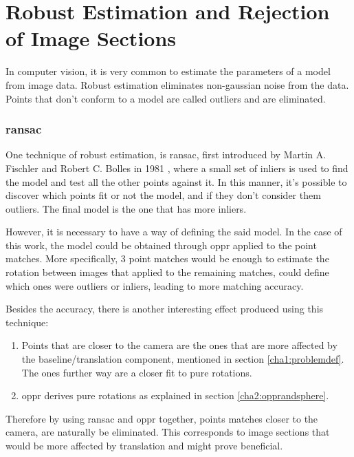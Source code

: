 
\section{Robust Estimation and Rejection of Image Sections}
\label{cha2:robustest}

In computer vision, it is very common to estimate the parameters of a model from image data. Robust estimation eliminates non-gaussian noise from the data. Points that don’t conform to a model are called outliers and are eliminated.

\subsubsection{\acrlong{ransac}}

One technique of robust estimation, is \acrfull{ransac}, first introduced by Martin A. Fischler and Robert C. Bolles in 1981 \cite{ransac}, where a small set of inliers is used to find the model and test all the 
other points against it. In this manner, it's possible to discover which points fit or not the model, and if they don’t consider them outliers. The final model is the one that has more inliers. 

However, it is necessary to have a way of defining the said model. In the case of this work, the model could be obtained through \acrlong{oppr} applied to the point matches. More specifically, 3 point matches would be enough to estimate the rotation between images that applied to the remaining matches, could define which ones were outliers or inliers, leading to more matching accuracy.

Besides the accuracy, there is another interesting effect produced using this technique:

\begin{enumerate}
\item Points that are closer to the camera are the ones that are more affected by the baseline/translation component, mentioned in section \ref{cha1:problemdef}. The ones further way are a closer fit to pure rotations.

\item \acrshort{oppr} derives pure rotations as explained in section \ref{cha2:opprandsphere}. 
\end{enumerate}
Therefore by using \acrshort{ransac} and \acrshort{oppr} together, points matches closer to the camera, are naturally be eliminated. This corresponds to image sections that would be more affected by translation and might prove beneficial. \cite{mono} 

